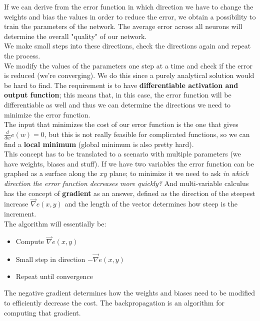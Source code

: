 If we can derive from the error function in which direction we have to change the weights and bias the values in order to reduce the error, we obtain a possibility to train the parameters of the network. The average error across all neurons will determine the overall "quality" of our network. \\
We make small steps into these directions, check the directions again and repeat the process.\\

We modify the values of the parameters one step at a time and check if the error is reduced (we're converging). We do this since a purely analytical solution would be hard to find. The requirement is to have \textbf{differentiable activation and output function}; this means that, in this case, the error function will be differentiable as well and thus we can determine the directions we need to minimize the error function.\\

The input that minimizes the cost of our error function is the one that gives $\frac{d}{dw} e(w) = 0$, but this is not really feasible for complicated functions, so we can find a \textbf{local minimum} (global minimum is also pretty hard).\\

This concept has to be translated to a scenario with multiple parameters (we have weights, biases and stuff). If we have two variables the error function can be graphed as a surface along the $xy$ plane; to minimize it we need to ask \textit{in which direction the error function decreases more quickly?} And multi-variable calculus has the concept of \textbf{gradient} as an answer, defined as the direction of the steepest increase $\vec{\nabla} e(x,y)$ and the length of the vector determines how steep is the increment.\\

The algorithm will essentially be: 
\begin{itemize}
	\item Compute $\vec{\nabla} e(x,y)$
	\item Small step in direction $- \vec{\nabla} e(x,y)$
	\item Repeat until convergence
\end{itemize}
The negative gradient determines how the weights and biases need to be modified to efficiently decrease the cost. The backpropagation is an algorithm for computing that gradient.\\

